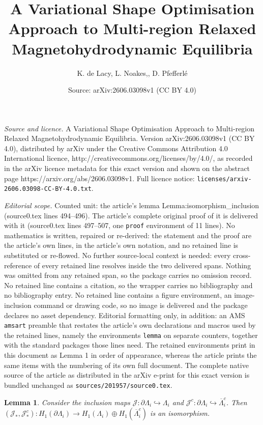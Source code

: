 \documentclass[10pt,a4paper]{amsart}
\title{A Variational Shape Optimisation Approach to Multi-region Relaxed Magnetohydrodynamic Equilibria}
\author{K. de Lacy, L. Noakes,, D. Pfefferl\'e}
\date{Source: arXiv:2606.03098v1 (CC BY 4.0)}
\newtheorem{lemma}{Lemma}
\newcommand{\ST}{\Lambda}
\begin{document}
\maketitle

\noindent\emph{Source and licence.} A Variational Shape Optimisation Approach to Multi-region Relaxed Magnetohydrodynamic Equilibria. Version arXiv:2606.03098v1 (CC BY 4.0), distributed by arXiv under the Creative Commons Attribution 4.0 International licence, http://creativecommons.org/licenses/by/4.0/, as recorded in the arXiv licence metadata for this exact version and shown on the abstract page https://arxiv.org/abs/2606.03098v1. Full licence notice: \texttt{licenses/arxiv-2606.03098-CC-BY-4.0.txt}.\par\smallskip

\noindent\textit{Editorial scope.} Counted unit: the article's lemma Lemma:isomorphism\_inclusion (source0.tex lines 494--496). The article's complete original proof of it is delivered with it (source0.tex lines 497--507, one \texttt{proof} environment of 11 lines). No mathematics is written, repaired or re-derived: the statement and the proof are the article's own lines, in the article's own notation, and no retained line is substituted or re-flowed.  No further source-local context is needed: every cross-reference of every retained line resolves inside the two delivered spans.  Nothing was omitted from any retained span, so the package carries no omission record.  No retained line contains a citation, so the wrapper carries no bibliography and no bibliography entry.  No retained line contains a figure environment, an image-inclusion command or drawing code, so no image is delivered and the package declares no asset dependency.  Editorial formatting only, in addition: an AMS \texttt{amsart} preamble that restates the article's own declarations and macros used by the retained lines, namely the environments \texttt{lemma} on separate counters, together with the standard packages those lines need.  The retained environments print in this document as Lemma 1 in order of appearance, whereas the article prints the same items with the numbering of its own full document.  The complete native source of the article as distributed in the arXiv e-print for this exact version is bundled unchanged as \texttt{sources/201957/source0.tex}.
\begin{lemma}\label{Lemma:isomorphism_inclusion}
    Consider the inclusion maps \(\mathcal{J} : \partial \ST_i \hookrightarrow \ST_i\) and \(\mathcal{J}^c : \partial \ST_i \hookrightarrow \overline{\ST}^c_i\). Then \((\mathcal{J}_*, \mathcal{J}^c_*) : H_1(\partial \ST_i) \to H_1(\ST_i) \oplus H_1(\overline{\ST}^c_i)\) is an isomorphism.
\end{lemma}
\end{document}
